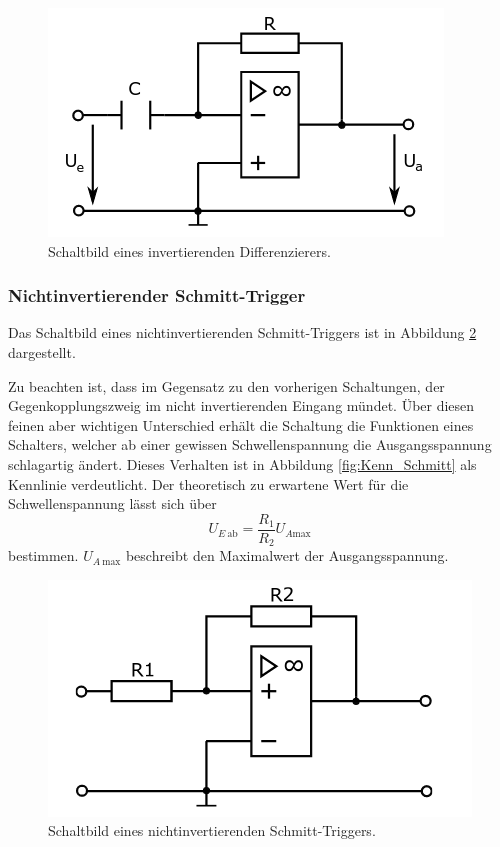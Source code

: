 \begin{figure}
    \centering 
    \includegraphics[width=.5\textwidth]{Bilder/Inv_Dif.png}
    \caption{Schaltbild eines invertierenden Differenzierers.}
    \label{fig:Inv_Dif}
\end{figure}


\subsubsection{Nichtinvertierender Schmitt-Trigger}

Das Schaltbild eines nichtinvertierenden Schmitt-Triggers ist in Abbildung \ref{fig:Schmitt} dargestellt.

Zu beachten ist, dass im Gegensatz zu den vorherigen Schaltungen, der Gegenkopplungszweig im nicht invertierenden Eingang mündet.
Über diesen feinen aber wichtigen Unterschied erhält die Schaltung die Funktionen eines Schalters, welcher ab einer gewissen Schwellenspannung die Ausgangsspannung schlagartig ändert.
Dieses Verhalten ist in Abbildung \ref{fig:Kenn_Schmitt} als Kennlinie verdeutlicht.
Der theoretisch zu erwartene Wert für die Schwellenspannung lässt sich über
\begin{equation}
    U_{E \: \text{ab}} = \frac{R_1}{R_2} U_{A\text{max}}
    \label{eq:schmitt}
\end{equation}
bestimmen.
$U_{A \: \text{max}}$ beschreibt den Maximalwert der Ausgangsspannung.

\begin{figure}
    \centering 
    \includegraphics[width=.5\textwidth]{Bilder/Schmitt.png}
    \caption{Schaltbild eines nichtinvertierenden Schmitt-Triggers.}
    \label{fig:Schmitt}
\end{figure}

